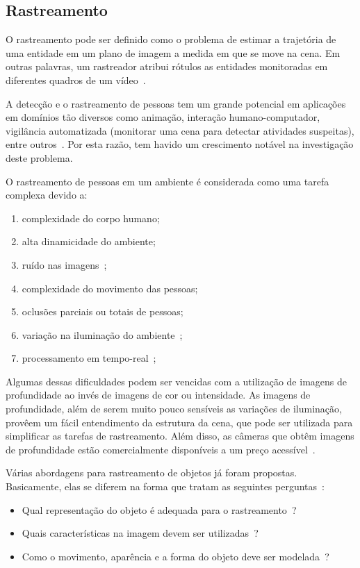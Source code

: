 \subsection {Rastreamento}	

	O rastreamento pode ser definido como o problema de estimar a trajetória de uma entidade em um plano de imagem a medida em que se move na cena. Em outras palavras, um rastreador atribui rótulos as entidades monitoradas em diferentes quadros de um vídeo~\cite{yilmaz}.

	A detecção e o rastreamento de pessoas tem um grande potencial em aplicações em domínios tão diversos como animação, interação humano-computador, vigilância automatizada (monitorar uma cena para detectar atividades suspeitas), entre outros~\cite{yilmaz}. Por esta razão, tem havido um crescimento notável na investigação deste problema.

	O rastreamento de pessoas em um ambiente é considerada como uma tarefa complexa devido a:

		\begin{enumerate}
			\item complexidade do corpo humano;
			\item alta dinamicidade do ambiente;
			\item ruído nas imagens~\cite{yilmaz};
			\item complexidade do movimento das pessoas;
			\item oclusões parciais ou totais de pessoas;
			\item variação na iluminação do ambiente~\cite{yilmaz};
			\item processamento em tempo-real~\cite{yilmaz};
		\end{enumerate}

	Algumas dessas dificuldades podem ser vencidas com a utilização de imagens de profundidade ao invés de imagens de cor ou intensidade. As imagens de profundidade, além de serem muito pouco sensíveis as variações de iluminação, provêem um fácil entendimento da estrutura da cena, que pode ser utilizada para simplificar as tarefas de rastreamento. Além disso, as câmeras que obtêm imagens de profundidade estão comercialmente disponíveis a um preço acessível~\cite{nikos}.

	Várias abordagens para rastreamento de objetos já foram propostas. Basicamente, elas se diferem na forma que tratam as seguintes perguntas~\cite{yilmaz}: 
		
		\begin{itemize}
			\item Qual representação do objeto é adequada para o rastreamento~\cite{yilmaz}?
			\item Quais características na imagem devem ser utilizadas~\cite{yilmaz}?
			\item Como o movimento, aparência e a forma do objeto deve ser modelada~\cite{yilmaz}? 
		\end{itemize}

